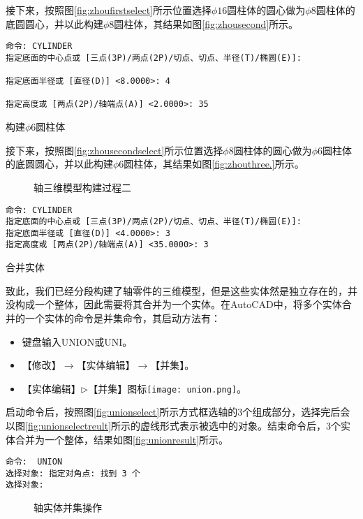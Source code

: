 \begin{procedure}
接下来，按照图\ref{fig:zhoufirstselect}所示位置选择$\phi 16$圆柱体的圆心做为$\phi 8$圆柱体的底圆圆心，并以此构建$\phi 8$圆柱体，其结果如图\ref{fig:zhousecond}所示。

\begin{lstlisting}
命令: CYLINDER
指定底面的中心点或 [三点(3P)/两点(2P)/切点、切点、半径(T)/椭圆(E)]:

指定底面半径或 [直径(D)] <8.0000>: 4

指定高度或 [两点(2P)/轴端点(A)] <2.0000>: 35
\end{lstlisting}
\item 构建$\phi 6$圆柱体

接下来，按照图\ref{fig:zhousecondselect}所示位置选择$\phi 8$圆柱体的圆心做为$\phi 6$圆柱体的底圆圆心，并以此构建$\phi 6$圆柱体，其结果如图\ref{fig:zhouthree.}所示。

\begin{figure}[htbp]
\centering
{}\hspace{30pt}
\caption{轴三维模型构建过程二}
\end{figure}

\begin{lstlisting}
命令: CYLINDER
指定底面的中心点或 [三点(3P)/两点(2P)/切点、切点、半径(T)/椭圆(E)]:
指定底面半径或 [直径(D)] <4.0000>: 3
指定高度或 [两点(2P)/轴端点(A)] <35.0000>: 3
\end{lstlisting}
\item 合并实体

致此，我们已经分段构建了轴零件的三维模型，但是这些实体然是独立存在的，并没构成一个整体，因此需要将其合并为一个实体。在AutoCAD中，将多个实体合并的一个实体的命令是并集命令，其启动方法有：
\begin{itemize}
\item 键盘输入UNION或UNI。
\item 【修改】$\rightarrow$【实体编辑】$\rightarrow$【并集】。
\item 【实体编辑】$\triangleright$【并集】图标\texttt{[image: union.png]}。
\end{itemize}

启动命令后，按照图\ref{fig:unionselect}所示方式框选轴的3个组成部分，选择完后会以图\ref{fig:unionselectreult}所示的虚线形式表示被选中的对象。结束命令后，3个实体合并为一个整体，结果如图\ref{fig:unionresult}所示。
\begin{lstlisting}
命令:  UNION
选择对象: 指定对角点: 找到 3 个
选择对象:
\end{lstlisting}
\begin{figure}[htbp]
\centering
{}\hspace{20pt}
\hspace{20pt}
\caption{轴实体并集操作}
\end{figure}


\end{procedure}
